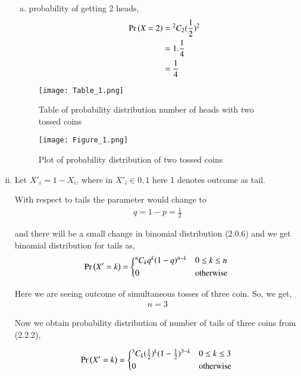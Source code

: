 \documentclass[journal,12pt,twocolumn]{IEEEtran}
\begin{document}
\begin{enumerate}[(i)]
\begin{enumerate}[(a)]
    \item probability of getting 2 heads,
        \begin{align}
            \begin{split}
                \Pr\left(X=2\right) &= {^2C_2}(\frac{1}{2})^2\\
                &=1.\frac{1}{4}\\
                &=\frac{1}{4}
            \end{split}
        \end{align}
\end{enumerate}

\begin{figure}[h!]
    \centering
    \texttt{[image: Table\_1.png]}
    \caption{Table of probability distribution number of heads with two tossed coins}
    \label{fig:Table_1}
\end{figure}

\begin{figure}[h!]
    \centering
    \texttt{[image: Figure\_1.png]}
    \caption{Plot of probability distribution of two tossed coins}
    \label{fig:Two coins}
\end{figure}

\item

Let $X'_i=1-X_i$, where in $X'_i \in {0,1}$ here 1 denotes outcome as tail.

With respect to tails the parameter would change to 
\begin{align}
    q=1-p=\frac{1}{2}
\end{align}

and there will be a small change in binomial distribution (2.0.6) and we get binomial distribution for tails as,
\begin{align}
   \pr{X'=k} =
  \begin{cases*}
    {^n C_k}q^{k}(1-q)^{n-k} & $0 \leq k \leq n$\\
      0 & otherwise
  \end{cases*}
\end{align}

Here we are seeing outcome of simultaneous tosses of three coin. So, we get,
\begin{align}
    n=3
\end{align}

Now we obtain probability distribution of number of tails of three coins from (2.2.2),

\begin{align*}
   \pr{X'=k} =
  \begin{cases*}
    {^3 C_k}(\frac{1}{2})^{k}(1-\frac{1}{2})^{3-k} & $0 \leq k \leq 3$\\
    0 & otherwise
  \end{cases*}
\end{align*}


\end{enumerate}
\end{document}
